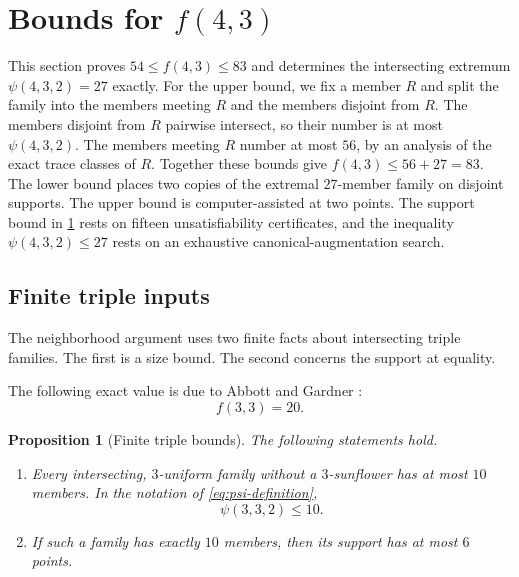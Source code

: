 \documentclass[11pt]{article}
\numberwithin{equation}{section}
\newtheorem{proposition}[proposition]{Proposition}
\theoremstyle{definition}
\theoremstyle{remark}
\begin{document}
\section{Bounds for \texorpdfstring{$f(4,3)$}{f(4,3)}}
\label{sec:f43}

This section proves $54\le f(4,3)\le83$ and determines the intersecting
extremum $\psi(4,3,2)=27$ exactly. For the upper bound, we fix a member $R$
and split the family into the members meeting $R$ and the members disjoint
from $R$. The members disjoint from $R$ pairwise intersect, so their number
is at most $\psi(4,3,2)$. The members meeting $R$ number at most $56$, by
an analysis of the exact trace classes of $R$. Together these bounds give
$f(4,3)\le56+27=83$. The lower bound places two copies of the extremal
$27$-member family on disjoint supports. The upper bound is
computer-assisted at two points. The support bound in
\cref{prop:f43-triple-inputs} rests on fifteen unsatisfiability
certificates, and the inequality $\psi(4,3,2)\le27$ rests on an exhaustive
canonical-augmentation search.

\subsection{Finite triple inputs}

The neighborhood argument uses two finite facts about intersecting triple
families. The first is a size bound. The second concerns the support at
equality.

The following exact value is due to Abbott and Gardner
\cite{AbbottGardner1969}:
\begin{equation}
 f(3,3)=20.
 \label{eq:f33-exact}
\end{equation}

\begin{proposition}[Finite triple bounds]
\label{prop:f43-triple-inputs}
The following statements hold.
\begin{enumerate}[label=\textup{(\roman*)}]
\item Every intersecting, $3$-uniform family without a $3$-sunflower has at
      most $10$ members. In the notation of \cref{eq:psi-definition},
      \[
       \psi(3,3,2)\le10.
      \]
\item If such a family has exactly $10$ members, then its support has at most
      $6$ points.
\end{enumerate}
\end{proposition}
\end{document}
